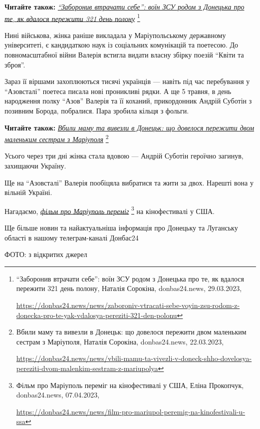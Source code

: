 \textbf{Читайте також:} \href{https://donbas24.news/news/zaboroniv-vtracati-sebe-voyin-zsu-rodom-z-donecka-pro-te-yak-vdalosya-pereziti-321-den-polonu}{\emph{\enquote{Заборонив втрачати себе}: воїн ЗСУ родом з Донецька про те, як вдалося пережити 321 день полону}}%
\footnote{\enquote{Заборонив втрачати себе}: воїн ЗСУ родом з Донецька про те, як вдалося пережити 321 день полону, Наталія Сорокіна, donbas24.news, 29.03.2023, \par%
\url{https://donbas24.news/news/zaboroniv-vtracati-sebe-voyin-zsu-rodom-z-donecka-pro-te-yak-vdalosya-pereziti-321-den-polonu}%
}

Нині військова, жінка раніше викладала у Маріупольському державному
університеті, є кандидаткою наук із соціальних комунікацій та поетесою. До
повномасштабної війни Валерія встигла видати власну збірку поезій \enquote{Квіти та
зброя}.

Зараз її віршами захоплюються тисячі українців — навіть під час перебування у
\enquote{Азовсталі} поетеса писала нові проникливі рядки. А ще 5 травня, в день
народження полку \enquote{Азов} Валерія та її коханий, прикордонник Андрій Суботін з
позивним Борода, побралися. Пара зробила кільця з фольги.


\textbf{Читайте також:} \href{https://donbas24.news/news/vbili-mamu-ta-vivezli-v-doneck-shho-dovelosya-pereziti-dvom-malenkim-sestram-z-mariupolya}{\emph{Вбили маму та вивезли в Донецьк: що довелося пережити двом маленьким сестрам з Маріуполя}}%
\footnote{Вбили маму та вивезли в Донецьк: що довелося пережити двом маленьким сестрам з Маріуполя, Наталія Сорокіна, donbas24.news, 22.03.2023, \par%
\url{https://donbas24.news/news/vbili-mamu-ta-vivezli-v-doneck-shho-dovelosya-pereziti-dvom-malenkim-sestram-z-mariupolya}%
}

Усього через три дні жінка стала вдовою — Андрій Суботін героїчно загинув,
захищаючи Україну.

Ще на \enquote{Азовсталі} Валерія пообіцяла вибратися та жити за двох. Нарешті
вона у вільній Україні.

Нагадаємо, \href{https://donbas24.news/news/film-pro-mariupol-peremig-na-kinofestivali-u-ssa}{\emph{фільм про Маріуполь переміг}}%
\footnote{Фільм про Маріуполь переміг на кінофестивалі у США, Еліна Прокопчук, donbas24.news, 07.04.2023, \par\url{https://donbas24.news/news/film-pro-mariupol-peremig-na-kinofestivali-u-ssa}}
на кінофестивалі у США.

Ще більше новин та найактуальніша інформація про Донецьку та Луганську області
в нашому телеграм-каналі Донбас24

ФОТО: з відкритих джерел

